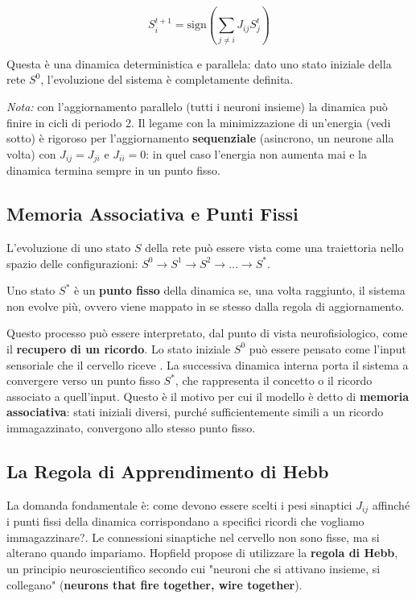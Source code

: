 \begin{tcolorbox}[colback=yellow!30,  
                  colframe=yellow!50!orange,  
                  boxrule=0.8pt, 
                  arc=3pt,  
                  top=4pt, bottom=4pt, left=6pt, right=6pt,
                  enhanced,
                  sharp corners=south]
\begin{equation}
S_i^{t+1} = \text{sign}\left(\sum_{j \neq i} J_{ij} S_j^t\right)
\end{equation}
\end{tcolorbox}


Questa è una dinamica deterministica e parallela: dato uno stato iniziale della rete $S^0$, l'evoluzione del sistema è completamente definita.

\noindent\textit{Nota:} con l'aggiornamento parallelo (tutti i neuroni insieme) la dinamica può finire in cicli di periodo 2. Il legame con la minimizzazione di un'energia (vedi sotto) è rigoroso per l'aggiornamento \textbf{sequenziale} (asincrono, un neurone alla volta) con $J_{ij}=J_{ji}$ e $J_{ii}=0$: in quel caso l'energia non aumenta mai e la dinamica termina sempre in un punto fisso.

\subsection{Memoria Associativa e Punti Fissi}
L'evoluzione di uno stato $S$ della rete può essere vista come una traiettoria nello spazio delle configurazioni: $S^0 \rightarrow S^1 \rightarrow S^2 \rightarrow \dots \rightarrow S^*$. 

Uno stato $S^*$ è un \textbf{punto fisso} della dinamica se, una volta raggiunto, il sistema non evolve più, ovvero viene mappato in se stesso dalla regola di aggiornamento.

Questo processo può essere interpretato, dal punto di vista neurofisiologico, come il \textbf{recupero di un ricordo}. Lo stato iniziale $S^0$ può essere pensato come l'input sensoriale che il cervello riceve . La successiva dinamica interna porta il sistema a convergere verso un punto fisso $S^*$, che rappresenta il concetto o il ricordo associato a quell'input. Questo è il motivo per cui il modello è detto di \textbf{memoria associativa}: stati iniziali diversi, purché sufficientemente simili a un ricordo immagazzinato, convergono allo stesso punto fisso.

\subsection{La Regola di Apprendimento di Hebb}
La domanda fondamentale è: come devono essere scelti i pesi sinaptici $J_{ij}$ affinché i punti fissi della dinamica corrispondano a specifici ricordi che vogliamo immagazzinare?. Le connessioni sinaptiche nel cervello non sono fisse, ma si alterano quando impariamo. Hopfield propose di utilizzare la \textbf{regola di Hebb}, un principio neuroscientifico secondo cui "neuroni che si attivano insieme, si collegano" (\textbf{neurons that fire together, wire together}).

